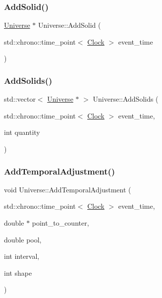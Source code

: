 \mbox{\label{classUniverse_a598799e2fcdf9ed60e83e9f5a61bfc05}} 
\subsubsection{\texorpdfstring{Add\+Solid()}{AddSolid()}}
{\footnotesize\ttfamily \mbox{\hyperlink{classUniverse}{Universe}} $\ast$ Universe\+::\+Add\+Solid (\begin{DoxyParamCaption}\item[{std\+::chrono\+::time\+\_\+point$<$ \mbox{\hyperlink{universe_8h_a0ef8d951d1ca5ab3cfaf7ab4c7a6fd80}{Clock}} $>$}]{event\+\_\+time }\end{DoxyParamCaption})}

\mbox{\label{classUniverse_a410d5ba2224fe90584b1f1aa5b38b41c}} 
\subsubsection{\texorpdfstring{Add\+Solids()}{AddSolids()}}
{\footnotesize\ttfamily std\+::vector$<$ \mbox{\hyperlink{classUniverse}{Universe}} $\ast$ $>$ Universe\+::\+Add\+Solids (\begin{DoxyParamCaption}\item[{std\+::chrono\+::time\+\_\+point$<$ \mbox{\hyperlink{universe_8h_a0ef8d951d1ca5ab3cfaf7ab4c7a6fd80}{Clock}} $>$}]{event\+\_\+time,  }\item[{int}]{quantity }\end{DoxyParamCaption})}

\mbox{\label{classUniverse_a901e16db5e8af258c66af7ac75662fe0}} 
\subsubsection{\texorpdfstring{Add\+Temporal\+Adjustment()}{AddTemporalAdjustment()}}
{\footnotesize\ttfamily void Universe\+::\+Add\+Temporal\+Adjustment (\begin{DoxyParamCaption}\item[{std\+::chrono\+::time\+\_\+point$<$ \mbox{\hyperlink{universe_8h_a0ef8d951d1ca5ab3cfaf7ab4c7a6fd80}{Clock}} $>$}]{event\+\_\+time,  }\item[{double $\ast$}]{point\+\_\+to\+\_\+counter,  }\item[{double}]{pool,  }\item[{int}]{interval,  }\item[{int}]{shape }\end{DoxyParamCaption})\hspace{0.3cm}{\ttfamily [virtual]}}



